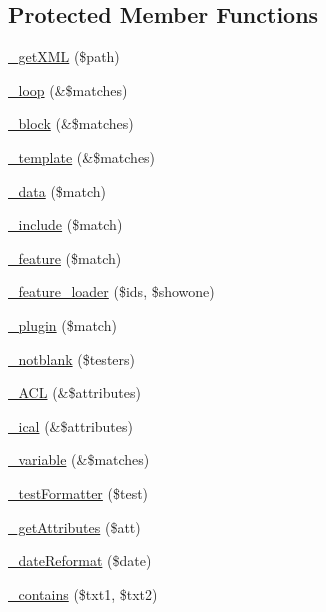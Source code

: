 \subsection*{Protected Member Functions}
\begin{DoxyCompactItemize}
\item 
\hyperlink{classtemplater_a987b88a6ad571a9c4b18900a59de2cf1}{\_\-getXML} (\$path)
\item 
\hyperlink{classtemplater_a08bc130dde68ebbef1a0ecbcd4dc80f4}{\_\-loop} (\&\$matches)
\item 
\hyperlink{classtemplater_a105fd4fd2d04263da1688461af3bfb1c}{\_\-block} (\&\$matches)
\item 
\hyperlink{classtemplater_a075e62e0defc4943e453bfc8949207a2}{\_\-template} (\&\$matches)
\item 
\hyperlink{classtemplater_afe09ec38c203a7906bfe4dc3de39229e}{\_\-data} (\$match)
\item 
\hyperlink{classtemplater_acb5dac6096e17eb7c7dc1aaab994d8f2}{\_\-include} (\$match)
\item 
\hyperlink{classtemplater_a345b5176475e6002c36ddb34db9d3492}{\_\-feature} (\$match)
\item 
\hyperlink{classtemplater_af7bc1d3618ff46e6a368a3a8a3eb47d7}{\_\-feature\_\-loader} (\$ids, \$showone)
\item 
\hyperlink{classtemplater_a6ea00eab265dfcba5b44ffd1e2836215}{\_\-plugin} (\$match)
\item 
\hyperlink{classtemplater_a421ef5fd3409c14911b123dedb0d569c}{\_\-notblank} (\$testers)
\item 
\hyperlink{classtemplater_ad92b7e7ac928563e309ff407bc975a4d}{\_\-ACL} (\&\$attributes)
\item 
\hyperlink{classtemplater_a03cce8ddd3c98e958ef5d0887f491085}{\_\-ical} (\&\$attributes)
\item 
\hyperlink{classtemplater_a632a0e87c541dcf981f2cbb59cbd1f53}{\_\-variable} (\&\$matches)
\item 
\hyperlink{classtemplater_a9f36397b7e6b1993fa271234467063f2}{\_\-testFormatter} (\$test)
\item 
\hyperlink{classtemplater_ac3c323257f1e5872b817d058a0a62a5e}{\_\-getAttributes} (\$att)
\item 
\hyperlink{classtemplater_aca1ddfa6fa3f8e348cff01d23556efda}{\_\-dateReformat} (\$date)
\item 
\hyperlink{classtemplater_aa84917bddd2eaa401c9c606311452f84}{\_\-contains} (\$txt1, \$txt2)
\end{DoxyCompactItemize}
